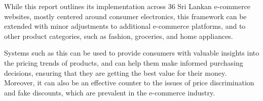 While this report outlines its implementation across 36 Sri Lankan e-commerce websites, mostly centered around consumer electronics, this framework can be extended with minor adjustments to additional e-commerce platforms, and to other product categories, such as fashion, groceries, and home appliances.

Systems such as this can be used to provide consumers with valuable insights into the pricing trends of products, and can help them make informed purchasing decisions, ensuring that they are getting the best value for their money.
Moreover, it can also be an effective counter to the issues of price discrimination and fake discounts, which are prevalent in the e-commerce industry.



